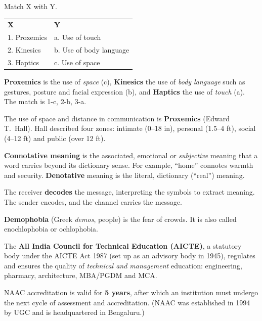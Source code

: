 Match X with Y.\\[2pt]
\begin{tabular}{@{}ll@{}}
\textbf{X} & \textbf{Y}\\
1. Proxemics & a. Use of touch\\
2. Kinesics & b. Use of body language\\
3. Haptics & c. Use of space\\
\end{tabular}

\textbf{Proxemics} is the use of \emph{space} (c), \textbf{Kinesics} the use of \emph{body language} such as gestures, posture and facial expression (b), and \textbf{Haptics} the use of \emph{touch} (a). The match is 1-c, 2-b, 3-a.

The use of space and distance in communication is \textbf{Proxemics} (Edward T.~Hall). Hall described four zones: intimate (0--18 in), personal (1.5--4 ft), social (4--12 ft) and public (over 12 ft).

\textbf{Connotative meaning} is the associated, emotional or \emph{subjective} meaning that a word carries beyond its dictionary sense. For example, ``home'' connotes warmth and security. \textbf{Denotative} meaning is the literal, dictionary (``real'') meaning.

The receiver \textbf{decodes} the message, interpreting the symbols to extract meaning. The sender encodes, and the channel carries the message.

\textbf{Demophobia} (Greek \emph{demos}, people) is the fear of crowds. It is also called enochlophobia or ochlophobia.

The \textbf{All India Council for Technical Education (AICTE)}, a statutory body under the AICTE Act 1987 (set up as an advisory body in 1945), regulates and ensures the quality of \emph{technical and management} education: engineering, pharmacy, architecture, MBA/PGDM and MCA.

NAAC accreditation is valid for \textbf{5 years}, after which an institution must undergo the next cycle of assessment and accreditation. (NAAC was established in 1994 by UGC and is headquartered in Bengaluru.)

